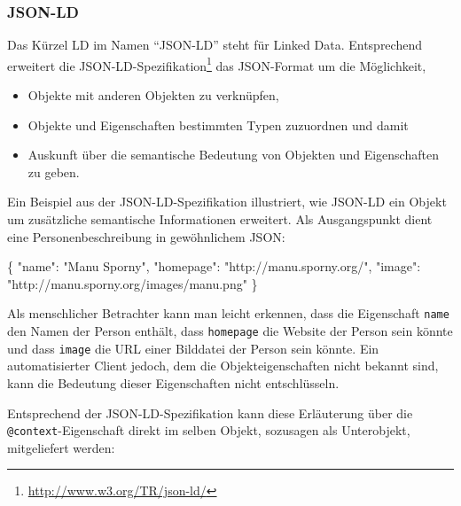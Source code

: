 \documentclass[,a4paper]{article}
\newenvironment{Shaded}{}{}
\newcommand{\DataTypeTok}[1]{\textcolor[rgb]{0.56,0.13,0.00}{{#1}}}
\newcommand{\StringTok}[1]{\textcolor[rgb]{0.25,0.44,0.63}{{#1}}}
\newcommand{\NormalTok}[1]{{#1}}
\begin{document}
\subsubsection{JSON-LD}\label{json-ld}

Das Kürzel LD im Namen ``JSON-LD'' steht für Linked Data. Entsprechend
erweitert die JSON-LD-Spezifikation\footnote{\url{http://www.w3.org/TR/json-ld/}}
das JSON-Format um die Möglichkeit,

\begin{itemize}
\itemsep1pt\parskip0pt
\item
  Objekte mit anderen Objekten zu verknüpfen,
\item
  Objekte und Eigenschaften bestimmten Typen zuzuordnen und damit
\item
  Auskunft über die semantische Bedeutung von Objekten und Eigenschaften
  zu geben.
\end{itemize}

Ein Beispiel aus der JSON-LD-Spezifikation illustriert, wie JSON-LD ein
Objekt um zusätzliche semantische Informationen erweitert. Als
Ausgangspunkt dient eine Personenbeschreibung in gewöhnlichem JSON:

\begin{Shaded}
\begin{Highlighting}[]
\NormalTok{\{}
  \DataTypeTok{"name"}\NormalTok{: }\StringTok{"Manu Sporny"}\NormalTok{,}
  \DataTypeTok{"homepage"}\NormalTok{: }\StringTok{"http://manu.sporny.org/"}\NormalTok{,}
  \DataTypeTok{"image"}\NormalTok{: }\StringTok{"http://manu.sporny.org/images/manu.png"}
\NormalTok{\}}
\end{Highlighting}
\end{Shaded}

Als menschlicher Betrachter kann man leicht erkennen, dass die
Eigenschaft \texttt{name} den Namen der Person enthält, dass
\texttt{homepage} die Website der Person sein könnte und dass
\texttt{image} die URL einer Bilddatei der Person sein könnte. Ein
automatisierter Client jedoch, dem die Objekteigenschaften nicht bekannt
sind, kann die Bedeutung dieser Eigenschaften nicht entschlüsseln.

Entsprechend der JSON-LD-Spezifikation kann diese Erläuterung über die
\texttt{@context}-Eigenschaft direkt im selben Objekt, sozusagen als
Unterobjekt, mitgeliefert werden:
\end{document}
